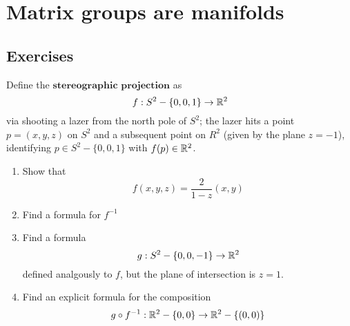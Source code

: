 \documentclass[12pt]{book}
\theoremstyle{definition}
\begin{document}
\begin{taggedexercise}[\textcolor{red}{TODO}]
  
\end{taggedexercise}

\chapter{Matrix groups are manifolds}
\section{Exercises}

\begin{taggedexercise}[\textcolor{green}{Complete}]
  Define the $\textbf{stereographic projection}$ as 
  \[
  f: S^2 - \{0,0,1\} \to \mathbb{R}^2
  \]
  via shooting a lazer from the north pole of $S^2$; the lazer hits a point $p = (x,y,z)$ on $S^2$ and a subsequent point on $R^2$ (given by the plane $z = -1$), identifying $p \in S^2 - \{0,0,1\}$ with $f(p) \in \mathbb{R}^2$.
  \begin{enumerate}
    \item Show that \[f(x,y,z) = \frac{2}{1-z}(x,y)\]
    \item Find a formula for $f^{-1}$
    \item Find a formula \[g: S^2 - \{0,0,-1\} \to \mathbb{R}^2\] defined analgously to $f$, but the plane of intersection is $z=1$.
    \item Find an explicit formula for the composition \[g \circ f^{-1} : \mathbb{R}^2 - \{0,0\} \to \mathbb{R}^2 - \{(0,0)\}\]
  \end{enumerate}
\end{taggedexercise}
\end{document}
